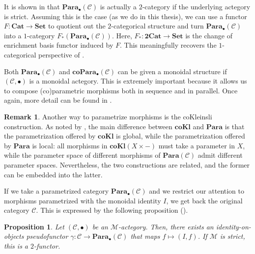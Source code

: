 \documentclass[11pt,a4paper,openright,twoside]{report}
\newcounter{mycounter}
\theoremstyle{plain}
\newtheorem{proposition}[mycounter]{Proposition}
\theoremstyle{definition}
\newtheorem{remark}[mycounter]{Remark}
\begin{document}
It is shown in \cite{gavranovic2024fundamental} that $\mathbf{Para}_{\bullet}(\mathcal{C})$ is actually a $2$-category if the underlying actegory is strict. Assuming this is the case (as we do in this thesis), we can use a functor $F: \mathbf{Cat} \to \mathbf{Set}$ to quotient out the $2$-categorical structure and turn $\mathbf{Para}_{\bullet}(\mathcal{C})$ into a $1$-category $F_{*}(\mathbf{Para}_{\bullet}(\mathcal{C}))$. Here, $F_{*}: \mathbf{2Cat} \to \mathbf{Set}$ is the change of enrichment basis functor induced by $F$. This meaningfully recovers the $1$-categorical perspective of \cite{fong2019backprop}.


Both $\mathbf{Para}_{\bullet}(\mathcal{C})$ and $\mathbf{coPara}_{\bullet}(\mathcal{C})$ can be given a monoidal structure if $(\mathcal{C}, \bullet)$ is a monoidal actegory. This is extremely important because it allows us to compose (co)parametric morphisms both in sequence and in parallel. Once again, more detail can be found in \cite{gavranovic2024fundamental}.


\begin{remark}
  Another way to parametrize morphisms is the coKleinsli construction. As noted by \cite{gavranovic2024fundamental}, the main difference between $\mathbf{coKl}$ and $\mathbf{Para}$ is that the parametrization offered by $\mathbf{coKl}$ is global, while the parametrization offered by $\mathbf{Para}$ is local: all morphisms in $\mathbf{coKl}(X \times -)$ must take a parameter in $X$, while the parameter space of different morphisms of $\mathbf{Para}(\mathcal{C})$ admit different parameter spaces. Nevertheless, the two constructions are related, and the former can be embedded into the latter.
\end{remark}


If we take a parametrized category $\mathbf{Para}_\bullet(\mathcal{C})$ and we restrict our attention to morphisms parametrized with the monoidal identity $I$, we get back the original category $\mathcal{C}$. This is expressed by the following proposition (\cite{gavranovic2024fundamental}).

\begin{proposition}
  \label{prop: embeddingth}
  Let $(\mathcal{C}, \bullet)$ be an $\mathcal{M}$-actegory. Then, there exists an identity-on-objects pseudofunctor $\gamma: \mathcal{C} \to \mathbf{Para}_\bullet(\mathcal{C})$ that maps $f \mapsto (I,f)$. If $\mathcal{M}$ is strict, this is a $2$-functor.
\end{proposition}
\end{document}
